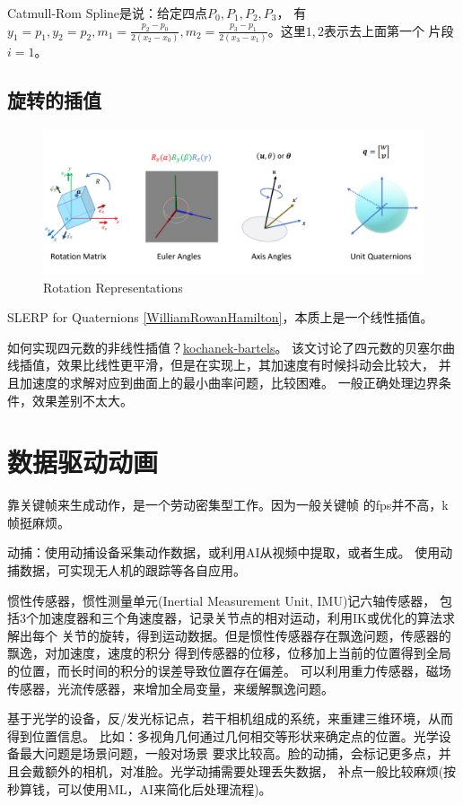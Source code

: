 \documentclass[lang=cn,newtx,10pt,scheme=chinese]{elegantbook}
\begin{document}
Catmull-Rom Spline是说：给定四点$P_0, P_1, P_2, P_3$，
有$y_1=p_1, y_2=p_2, m_1 = \frac{p_2 - p_0}{2(x_2 - x_0)},
m_2 = \frac{p_3 - p_1}{2(x_3 - x_1)}$。这里$1, 2$表示去上面第一个
片段$i=1$。

\subsection{旋转的插值}
\begin{figure}[htbp]
  \centering
  \includegraphics[totalheight=2in]{"./image/RotationRepresentations.png"}
  \caption{Rotation Representations} \label{fig:RotationRepresentations}
\end{figure}
SLERP for Quaternions \ref{WilliamRowanHamilton}，本质上是一个线性插值。

如何实现四元数的非线性插值？\href{https://splines.readthedocs.io/en/latest/rotation/kochanek-bartels.html}{kochanek-bartels}。
该文讨论了四元数的贝塞尔曲线插值，效果比线性更平滑，但是在实现上，其加速度有时候抖动会比较大，
并且加速度的求解对应到曲面上的最小曲率问题，比较困难。
一般正确处理边界条件，效果差别不太大。

\section{数据驱动动画}
靠关键帧来生成动作，是一个劳动密集型工作。因为一般关键帧
的fps并不高，k帧挺麻烦。


动捕：使用动捕设备采集动作数据，或利用AI从视频中提取，或者生成。
使用动捕数据，可实现无人机的跟踪等各自应用。

惯性传感器，惯性测量单元(Inertial Measurement Unit, IMU)记六轴传感器，
包括3个加速度器和三个角速度器，记录关节点的相对运动，利用IK或优化的算法求解出每个
关节的旋转，得到运动数据。但是惯性传感器存在飘逸问题，传感器的飘逸，对加速度，速度的积分
得到传感器的位移，位移加上当前的位置得到全局的位置，而长时间的积分的误差导致位置存在偏差。
可以利用重力传感器，磁场传感器，光流传感器，来增加全局变量，来缓解飘逸问题。

基于光学的设备，反/发光标记点，若干相机组成的系统，来重建三维环境，从而得到位置信息。
比如：多视角几何通过几何相交等形状来确定点的位置。光学设备最大问题是场景问题，一般对场景
要求比较高。脸的动捕，会标记更多点，并且会戴额外的相机，对准脸。光学动捕需要处理丢失数据，
补点一般比较麻烦(按秒算钱，可以使用ML，AI来简化后处理流程)。
\end{document}
